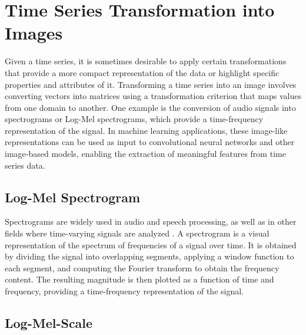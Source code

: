 


\section{Time Series Transformation into Images}

Given a time series, it is sometimes desirable to apply certain transformations that provide a more compact representation of the data or highlight specific properties and attributes of it. Transforming a time series into an image involves converting vectors into matrices using a transformation criterion that maps values from one domain to another. One example is the conversion of audio signals into spectrograms or Log-Mel spectrograms, which provide a time-frequency representation of the signal. In machine learning applications, these image-like representations can be used as input to convolutional neural networks and other image-based models, enabling the extraction of meaningful features from time series data.

\subsection{Log-Mel Spectrogram}

Spectrograms are widely used in audio and speech processing, as well as in other fields where time-varying signals are analyzed \cite{spectrogramns1}. A spectrogram is a visual representation of the spectrum of frequencies of a signal over time. It is obtained by dividing the signal into overlapping segments, applying a window function to each segment, and computing the Fourier transform to obtain the frequency content. The resulting magnitude is then plotted as a function of time and frequency, providing a time-frequency representation of the signal.

\subsection{Log-Mel-Scale}

